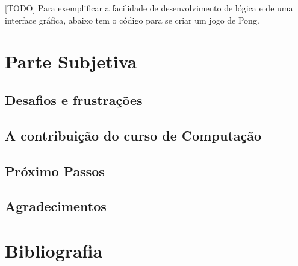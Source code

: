 \documentclass[a4paper,12pt]{article}
\begin{document}
[TODO] Para exemplificar a facilidade de desenvolvimento de lógica e de uma interface gráfica, abaixo tem o código para se criar um jogo de Pong.



\section{Parte Subjetiva}


\subsection{Desafios e frustrações}
\subsection{A contribuição do curso de Computação}
\subsection{Próximo Passos}
\subsection{Agradecimentos}






\section{Bibliografia}












 \singlespacing   %

\end{document}
